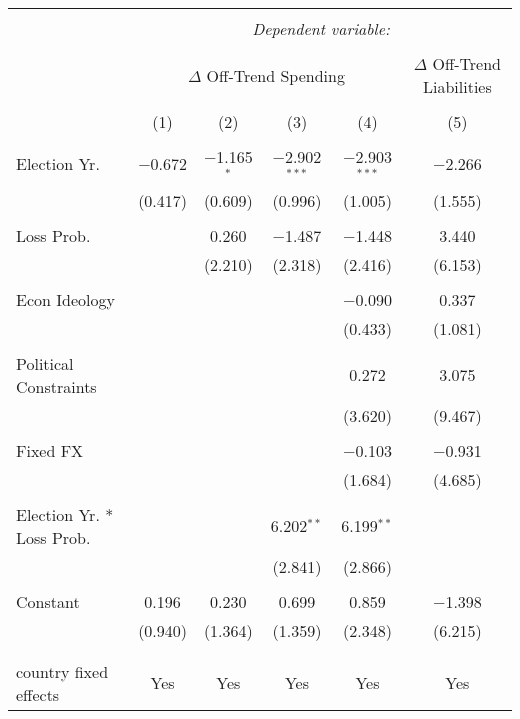 
\begingroup 
\tiny 
\begin{tabular}{@{\extracolsep{5pt}}lccccc} 
\\[-1.8ex]\hline 
\hline \\[-1.8ex] 
 & \multicolumn{5}{c}{\textit{Dependent variable:}} \\ 
\cline{2-6} 
\\[-1.8ex] & \multicolumn{4}{c}{$\Delta$ Off-Trend Spending} & $\Delta$ Off-Trend Liabilities \\ 
\\[-1.8ex] & (1) & (2) & (3) & (4) & (5)\\ 
\hline \\[-1.8ex] 
 Election Yr. & $-$0.672 & $-$1.165$^{*}$ & $-$2.902$^{***}$ & $-$2.903$^{***}$ & $-$2.266 \\ 
  & (0.417) & (0.609) & (0.996) & (1.005) & (1.555) \\ 
  & & & & & \\ 
 Loss Prob. &  & 0.260 & $-$1.487 & $-$1.448 & 3.440 \\ 
  &  & (2.210) & (2.318) & (2.416) & (6.153) \\ 
  & & & & & \\ 
 Econ Ideology &  &  &  & $-$0.090 & 0.337 \\ 
  &  &  &  & (0.433) & (1.081) \\ 
  & & & & & \\ 
 Political Constraints &  &  &  & 0.272 & 3.075 \\ 
  &  &  &  & (3.620) & (9.467) \\ 
  & & & & & \\ 
 Fixed FX &  &  &  & $-$0.103 & $-$0.931 \\ 
  &  &  &  & (1.684) & (4.685) \\ 
  & & & & & \\ 
 Election Yr. * Loss Prob. &  &  & 6.202$^{**}$ & 6.199$^{**}$ &  \\ 
  &  &  & (2.841) & (2.866) &  \\ 
  & & & & & \\ 
 Constant & 0.196 & 0.230 & 0.699 & 0.859 & $-$1.398 \\ 
  & (0.940) & (1.364) & (1.359) & (2.348) & (6.215) \\ 
  & & & & & \\ 
\hline \\[-1.8ex] 
country fixed effects & Yes & Yes & Yes & Yes & Yes \\ 

\end{tabular}
